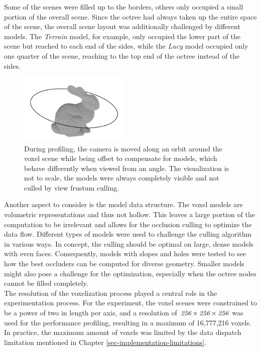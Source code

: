 \noindent
Some of the scenes were filled up to the borders, others only occupied a small portion of the overall scene. 
Since the octree had always taken up the entire space of the scene, the overall scene layout was additionally 
challenged by different models. The \emph{Terrain} model, for example, only occupied the lower part of the 
scene but reached to each end of the sides, while the \emph{Lucy} model occupied only one quarter of the scene, 
reaching to the top end of the octree instead of the sides. \\

\begin{figure}[h]
    \centering
    \includegraphics[width=200px]{images/graphics/test-anim-camera-path.jpg}
    \caption{During profiling, the camera is moved along an orbit around the voxel scene while being offset to compensate 
    for models, which behave differently when viewed from an angle. The visualization is not to scale, the models 
    were always completely visible and not culled by view frustum culling.}
    \label{fig:test-anim-camera-path}
\end{figure}

\noindent
Another aspect to consider is the model data structure. The voxel models are volumetric representations and thus 
not hollow. This leaves a large portion of the computation to be irrelevant and allows for the occlusion culling to 
optimize the data flow. Different types of models were used to challenge the culling algorithm in various ways. 
In concept, the culling should be optimal on large, dense models with even faces. Consequently, models with 
slopes and holes were tested to see how the best occluders can be computed for diverse geometry. Smaller models might 
also pose a challenge for the optimization, especially when the octree nodes cannot be filled completely. \\

\noindent
The resolution of the voxelization process played a central role in the experimentation process. For the experiment, 
the voxel scenes were constrained to be a power of two in length per axis, and a resolution of 
$\emph{256} \times \emph{256} \times \emph{256}$ was used for the performance profiling, resulting in a maximum of 
16,777,216 voxels. In practice, the maximum amount of voxels was limited by the data dispatch limitation mentioned in 
Chapter \ref{sec-implementation-limitations}.


